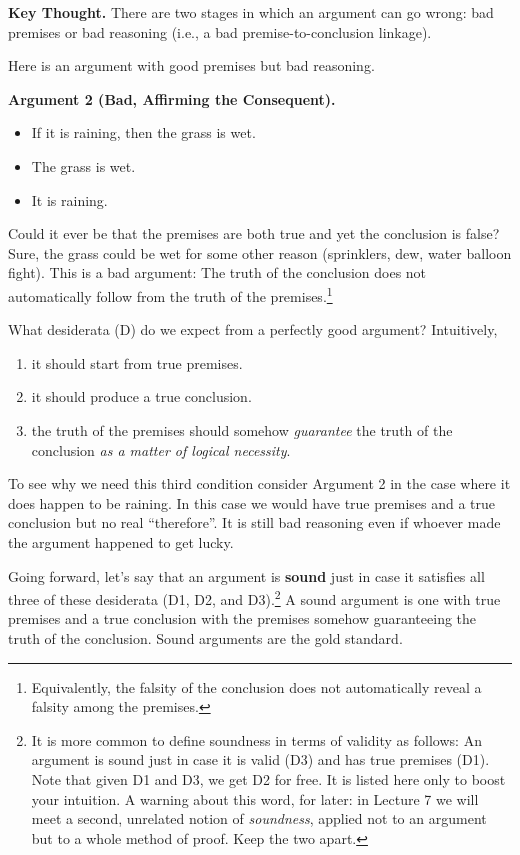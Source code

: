 \documentclass[options]{philosophersimprint}
\theoremstyle{definition}
\begin{document}
\textbf{Key Thought.} There are two stages in which an argument can go wrong: bad premises or bad reasoning (i.e., a bad premise-to-conclusion linkage).

Here is an argument with good premises but bad reasoning.

\textbf{Argument 2 (Bad, Affirming the Consequent).}
\begin{itemize}
    \item[] If it is raining, then the grass is wet.
    \item[] The grass is wet.
    \item[$\therefore$] It is raining.
\end{itemize}
Could it ever be that the premises are both true and yet the conclusion is false? Sure, the grass could be wet for some other reason (sprinklers, dew, water balloon fight). This is a bad argument: The truth of the conclusion does not automatically follow from the truth of the premises.\footnote{Equivalently, the falsity of the conclusion does not automatically reveal a falsity among the premises.}

What desiderata (D) do we expect from a perfectly good argument? Intuitively,
\begin{enumerate}
    \item[D1:] it should start from true premises.
    \item[D2:] it should produce a true conclusion.
    \item[D3:] the truth of the premises should somehow \textit{guarantee} the truth of the conclusion \textit{as a matter of logical necessity}.
\end{enumerate}
To see why we need this third condition consider Argument 2 in the case where it does happen to be raining. In this case we would have true premises and a true conclusion but no real ``therefore''. It is still bad reasoning even if whoever made the argument happened to get lucky.

Going forward, let's say that an argument is \textbf{sound} just in case it satisfies all three of these desiderata (D1, D2, and D3).\footnote{It is more common to define soundness in terms of validity as follows: An argument is sound just in case it is valid (D3) and has true premises (D1). Note that given D1 and D3, we get D2 for free. It is listed here only to boost your intuition. A warning about this word, for later: in Lecture 7 we will meet a second, unrelated notion of \textit{soundness}, applied not to an argument but to a whole method of proof. Keep the two apart.} A sound argument is one with true premises and a true conclusion with the premises somehow guaranteeing the truth of the conclusion. Sound arguments are the gold standard.
\end{document}
